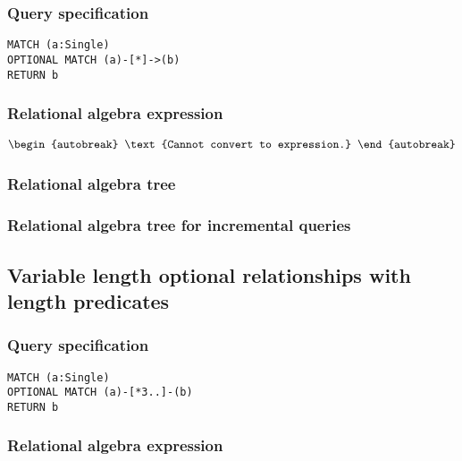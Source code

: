 \subsubsection*{Query specification}

\begin{lstlisting}
MATCH (a:Single)
OPTIONAL MATCH (a)-[*]->(b)
RETURN b
\end{lstlisting}

\subsubsection*{Relational algebra expression}

\begin{align*}
\begin{autobreak}
\text{Cannot convert to expression.}
\end{autobreak}
\end{align*}

\subsubsection*{Relational algebra tree}


\subsubsection*{Relational algebra tree for incremental queries}


\subsection{Variable length optional relationships with length predicates}

\subsubsection*{Query specification}

\begin{lstlisting}
MATCH (a:Single)
OPTIONAL MATCH (a)-[*3..]-(b)
RETURN b
\end{lstlisting}

\subsubsection*{Relational algebra expression}

